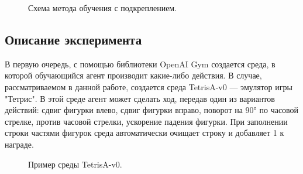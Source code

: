 \documentclass{article}
\begin{document}
\begin{figure}[h]
\caption{Схема метода обучения с подкреплением\cite{litlink19}.}
\label{ris:image}
\end{figure}
\newpage
\begin{center}
\section {Описание эксперимента}
\end{center}
В первую очередь, с помощью библиотеки OpenAI Gym создается среда, в которой обучающийся агент производит какие-либо действия. В случае, рассматриваемом в данной работе, создается среда TetrisA-v0 — эмулятор игры "Тетрис". В этой среде агент может сделать ход, передав один из вариантов действий: сдвиг фигурки влево, сдвиг фигурки вправо, поворот на 90° по часовой стрелке, против часовой стрелки, ускорение падения фигурки. При заполнении строки частями фигурок среда автоматически очищает строку и добавляет 1 к награде.\\
\begin{figure}[h]
\caption{Пример среды TetrisA-v0.}
\label{ris:image}
\end{figure}\\
\end{document}

